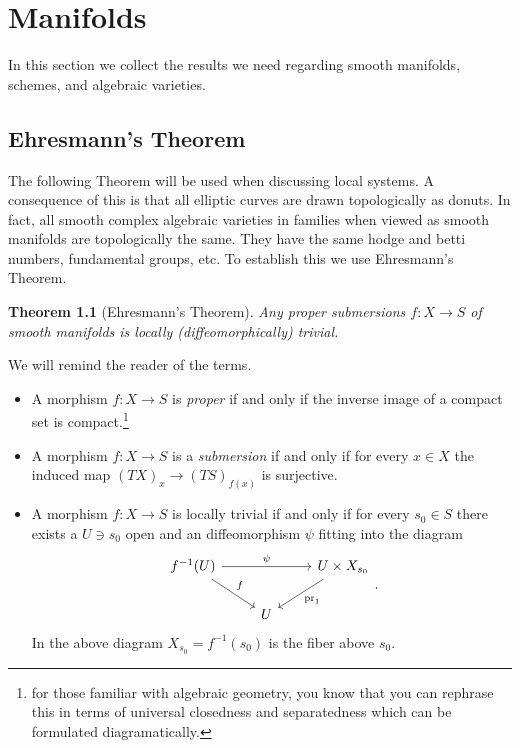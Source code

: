 \documentclass[12pt]{book}
\numberwithin{equation}{section}
\newtheorem{theorem}{Theorem}[subsection]
\theoremstyle{definition}
\theoremstyle{remark}
\newcommand{\pr}{\operatorname{pr}}
\begin{document}
\chapter[Spaces]{Manifolds}
In this section we collect the results we need regarding smooth manifolds, schemes, and algebraic varieties.
\section{Ehresmann's Theorem}
The following Theorem will be used when discussing local systems. 
A consequence of this is that all elliptic curves are drawn topologically as donuts. 
In fact, all smooth complex algebraic varieties in families when viewed as smooth manifolds are topologically the same. 
They have the same hodge and betti numbers, fundamental groups, etc. 
To establish this we use Ehresmann's Theorem.
\begin{theorem}[Ehresmann's Theorem]
	Any proper submersions $f:X\to S$ of smooth manifolds is locally (diffeomorphically) trivial. 
\end{theorem}
We will remind the reader of the terms.
\begin{itemize}
	\item A morphism $f:X\to S$ is \emph{proper} if and only if the inverse image of a compact set is compact.\footnote{for those familiar with algebraic geometry, you know that you can rephrase this in terms of universal closedness and separatedness which can be formulated diagramatically.}
	\item A morphism $f:X\to S$ is a \emph{submersion} if and only if for every $x\in X$ the induced map $(TX)_x \to (TS)_{f(x)}$ is surjective. 
	\item A morphism $f:X\to S$ is locally trivial if and only if for every $s_0 \in S$ there exists a $U \owns s_0$ open and an diffeomorphism $\psi$ fitting into the diagram
	$$\begin{tikzcd}
	f^{-1}(U) \ar[rr, "\psi"]\ar[dr, "f"]& & U \times X_{s_0} \ar[dl, "\pr_1"] \\
	& U & 
	\end{tikzcd}.$$	
	In the above diagram $X_{s_0} = f^{-1}(s_0)$ is the fiber above $s_0$.
\end{itemize}
\end{document}
